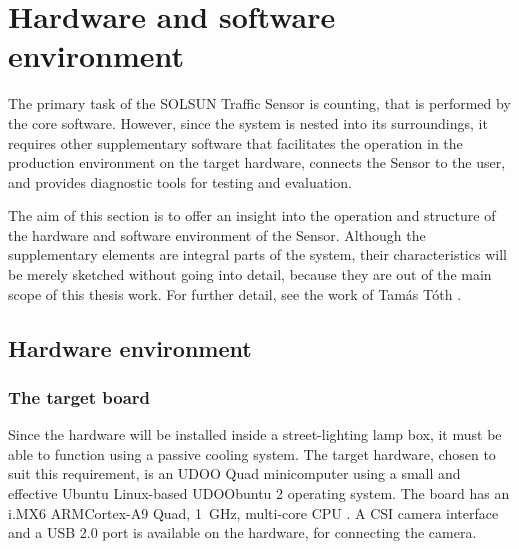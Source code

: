 \chapter{Hardware and software environment}\label{chap:Environment}
The primary task of the SOLSUN Traffic Sensor is counting, that is performed by the core software.
However, since the system is nested into its surroundings, it requires other supplementary software that facilitates the operation in the production environment on the target hardware, connects the Sensor to the user, and provides diagnostic tools for testing and evaluation.

The aim of this section is to offer an insight into the operation and structure of the hardware and software environment of the Sensor.
Although the supplementary elements are integral parts of the system, their characteristics will be merely sketched without going into detail, because they are out of the main scope of this thesis work.
For further detail, see the work of Tam{\'a}s T{\'o}th \cite{Toth2016}.
\section{Hardware environment}
\subsection{The target board}
Since the hardware will be installed inside a street-lighting lamp box, it must be able to function using a passive cooling system.
The target hardware, chosen to suit this requirement, is an UDOO Quad minicomputer using a small and effective Ubuntu Linux-based UDOObuntu 2 operating system.
The board has an i.MX6 ARM\reg Cortex\reg-A9 Quad, \SI{1}{GHz}, multi-core CPU \cite{UDOO, UDOO2}.
A CSI camera interface and a USB 2.0 port is available on the hardware, for connecting the camera.

